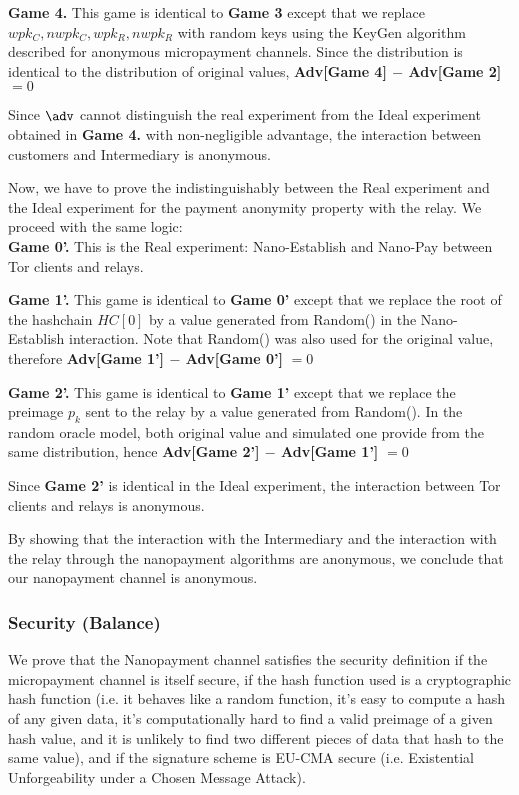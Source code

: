 \textbf{Game 4.} This game is identical to \textbf{Game 3} except that we replace $wpk_C, nwpk_C, wpk_R, nwpk_R$ with random keys using the KeyGen algorithm described for anonymous micropayment channels. Since the distribution is identical to the distribution of original values, \textbf{Adv[Game 4] $-$ Adv[Game 2]} $= 0$

Since $\adv$ cannot distinguish the real experiment from the Ideal experiment obtained in \textbf{Game 4.} with non-negligible advantage, the interaction between customers and Intermediary is anonymous.

Now, we have to prove the indistinguishably between the Real experiment and the Ideal experiment for the payment anonymity property with the relay.  We proceed with the same logic:\\

\textbf{Game 0'.} This is the Real experiment: Nano-Establish and Nano-Pay between  Tor clients and relays.

\textbf{Game 1'.} This game is identical to \textbf{Game 0'} except that we replace the root of the hashchain $HC[0]$ by a value generated from Random() in the Nano-Establish interaction. Note that Random() was also used for the original value, therefore \textbf{Adv[Game 1'] $-$ Adv[Game 0']} $= 0$

\textbf{Game 2'.} This game is identical to \textbf{Game 1'} except that we replace the preimage $p_k$ sent to the relay by a value generated from Random(). In the random oracle model, both original value and simulated one provide from the same distribution, hence \textbf{Adv[Game 2'] $-$ Adv[Game 1']} $= 0$

Since \textbf{Game 2'} is identical in the Ideal experiment, the interaction between Tor clients and relays is anonymous.

By showing that the interaction with the Intermediary and the interaction with the relay through the nanopayment algorithms are anonymous, we conclude that our nanopayment channel is anonymous.

\subsubsection{Security (Balance)}

We prove that the Nanopayment channel satisfies the security definition if the micropayment channel is itself secure, if the hash function used is a cryptographic hash function (i.e. it behaves like a random function, it's easy to compute a hash of any given data, it's computationally hard to find a valid preimage of a given hash value, and it is unlikely to find two different pieces of data that hash to the same value), and if the signature scheme is EU-CMA secure (i.e. Existential Unforgeability under a Chosen Message Attack).


